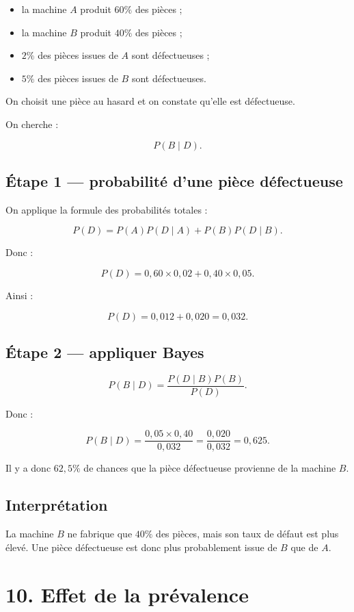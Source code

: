 \begin{itemize}
\item la machine $A$ produit $60\%$ des pièces ;
\item la machine $B$ produit $40\%$ des pièces ;
\item $2\%$ des pièces issues de $A$ sont défectueuses ;
\item $5\%$ des pièces issues de $B$ sont défectueuses.
\end{itemize}

On choisit une pièce au hasard et on constate qu'elle est défectueuse.

On cherche :

\[
P(B\mid D).
\]

\subsection{Étape 1 — probabilité d'une pièce défectueuse}

On applique la formule des probabilités totales :

\[
P(D)
=
P(A)P(D\mid A)+P(B)P(D\mid B).
\]

Donc :

\[
P(D)
=
0{,}60\times0{,}02
+
0{,}40\times0{,}05.
\]

Ainsi :

\[
P(D)=0{,}012+0{,}020=0{,}032.
\]

\subsection{Étape 2 — appliquer Bayes}

\[
P(B\mid D)
=
\frac{P(D\mid B)P(B)}{P(D)}.
\]

Donc :

\[
P(B\mid D)
=
\frac{0{,}05\times0{,}40}{0{,}032}
=
\frac{0{,}020}{0{,}032}
=
0{,}625.
\]

Il y a donc $62{,}5\%$ de chances que la pièce défectueuse provienne de la machine $B$.

\subsection{Interprétation}

La machine $B$ ne fabrique que $40\%$ des pièces, mais son taux de défaut est plus élevé. Une pièce défectueuse est donc plus probablement issue de $B$ que de $A$.


\section{10. Effet de la prévalence}

